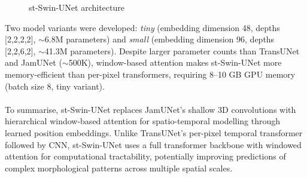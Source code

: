 \documentclass[10pt,oneside,a4paper,english]{article}
\begin{document}
\begin{figure}[H]
    \centering
    \caption{st-Swin-UNet architecture}
    \label{fig: StSwinUNet block diagram}
\end{figure}
\noindent Two model variants were developed: \textit{tiny} (embedding dimension 48, depths [2,2,2,2], $\sim$6.8M parameters) and \textit{small} (embedding dimension 96, depths [2,2,6,2], $\sim$41.3M parameters). Despite larger parameter counts than TransUNet and JamUNet ($\sim$500K), window-based attention makes st-Swin-UNet more memory-efficient than per-pixel transformers, requiring 8--10 GB GPU memory (batch size 8, tiny variant). \\
\\
To summarise, st-Swin-UNet replaces JamUNet's shallow 3D convolutions with hierarchical window-based attention for spatio-temporal modelling through learned position embeddings. Unlike TransUNet's per-pixel temporal transformer followed by CNN, st-Swin-UNet uses a full transformer backbone with windowed attention for computational tractability, potentially improving predictions of complex morphological patterns across multiple spatial scales.
\end{document}
